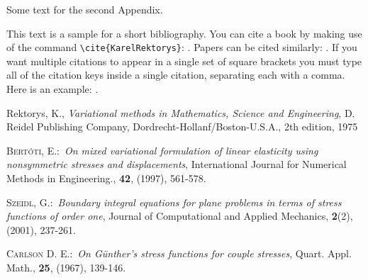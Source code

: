 \documentclass{amsbook}%
\theoremstyle{plain}
\numberwithin{equation}{section}
\begin{document}
Some text for the second Appendix.

This text is a sample for a short bibliography. You can cite a
book by making use of the command \verb"\cite{KarelRektorys}":
\cite{KarelRektorys}. Papers can be cited similarly:
\cite{Bertoti97}. If you want multiple citations to appear in a
single set of square brackets you must type all of the citation
keys inside a single citation, separating each with a comma. Here
is an example: \cite{Bertoti97, Szeidl2001, Carlson67}.

\begin{thebibliography}{9}
Rektorys, K., \textit{Variational methods in Mathematics,
Science and Engineering}, D. Reidel Publishing Company,
Dordrecht-Hollanf/Boston-U.S.A., 2th edition, 1975

 \textsc{Bert\'{o}ti, E.}:\ \textit{On mixed variational formulation
of linear elasticity using nonsymmetric stresses and
displacements}, International Journal for Numerical Methods in
Engineering., \textbf{42}, (1997), 561-578.

 \textsc{Szeidl, G.}:\ \textit{Boundary integral equations for
plane problems in terms of stress functions of order one}, Journal
of Computational and Applied Mechanics, \textbf{2}(2), (2001),
237-261.

  \textsc{Carlson D. E.}:\ \textit{On G\"{u}nther's stress functions
for couple stresses}, Quart. Appl. Math., \textbf{25}, (1967),
139-146.
\end{thebibliography}
\end{document}
